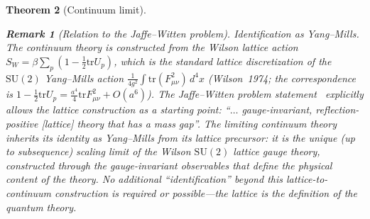 \documentclass[11pt]{article}
\newtheorem{theorem}{Theorem}[section]
\theoremstyle{definition}
\newtheorem{remark}[theorem]{Remark}
\newcommand{\SU}{\mathrm{SU}}
\newcommand{\tr}{\mathrm{tr}}
\begin{document}
\begin{theorem}[Continuum limit]
\begin{remark}[Relation to the Jaffe--Witten problem]
\emph{Identification as Yang--Mills.}
The continuum theory is constructed from the Wilson
lattice action $S_W=\beta\sum_p(1-\frac{1}{2}\tr U_p)$,
which is the standard lattice discretization of the
$\SU(2)$ Yang--Mills action
$\frac{1}{4g^2}\int\tr(F_{\mu\nu}^2)\,d^4x$
(Wilson~1974; the correspondence is
$1-\frac{1}{2}\tr U_p=\frac{a^4}{4}\tr F_{\mu\nu}^2+O(a^6)$).
The Jaffe--Witten problem statement~\cite{JaffeWitten}
explicitly allows the lattice construction as a starting
point: ``$\ldots$ gauge-invariant, reflection-positive
[lattice] theory that has a mass gap''.
The limiting continuum theory inherits its identity
as Yang--Mills from its lattice precursor: it is the
unique (up to subsequence) scaling limit of the Wilson
$\SU(2)$ lattice gauge theory, constructed through the
gauge-invariant observables that define the physical
content of the theory.  No additional
``identification'' beyond this lattice-to-continuum
construction is required or possible---the lattice
\emph{is} the definition of the quantum theory.
\end{remark}
\end{theorem}
\end{document}
